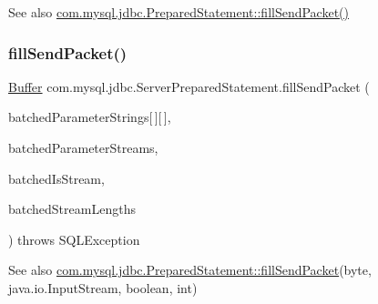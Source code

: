 \begin{DoxySeeAlso}{See also}
\mbox{\hyperlink{classcom_1_1mysql_1_1jdbc_1_1_prepared_statement_a0f1235a6e911d9370ef27e6ba5932d89}{com.\+mysql.\+jdbc.\+Prepared\+Statement\+::fill\+Send\+Packet()}} 
\end{DoxySeeAlso}
\mbox{\label{classcom_1_1mysql_1_1jdbc_1_1_server_prepared_statement_a923aa3af88e20d5927f9dbb827539724}} 
\subsubsection{\texorpdfstring{fill\+Send\+Packet()}{fillSendPacket()}\hspace{0.1cm}{\footnotesize\ttfamily [2/2]}}
{\footnotesize\ttfamily \mbox{\hyperlink{classcom_1_1mysql_1_1jdbc_1_1_buffer}{Buffer}} com.\+mysql.\+jdbc.\+Server\+Prepared\+Statement.\+fill\+Send\+Packet (\begin{DoxyParamCaption}\item[{byte}]{batched\+Parameter\+Strings\mbox{[}$\,$\mbox{]}\mbox{[}$\,$\mbox{]},  }\item[{Input\+Stream \mbox{[}$\,$\mbox{]}}]{batched\+Parameter\+Streams,  }\item[{boolean \mbox{[}$\,$\mbox{]}}]{batched\+Is\+Stream,  }\item[{int \mbox{[}$\,$\mbox{]}}]{batched\+Stream\+Lengths }\end{DoxyParamCaption}) throws S\+Q\+L\+Exception\hspace{0.3cm}{\ttfamily [protected]}}

\begin{DoxySeeAlso}{See also}
\mbox{\hyperlink{classcom_1_1mysql_1_1jdbc_1_1_prepared_statement_a0f1235a6e911d9370ef27e6ba5932d89}{com.\+mysql.\+jdbc.\+Prepared\+Statement\+::fill\+Send\+Packet}}(byte, java.\+io.\+Input\+Stream, boolean, int) 
\end{DoxySeeAlso}
\mbox{\label{classcom_1_1mysql_1_1jdbc_1_1_server_prepared_statement_abe61386d18ae6ff80a37435054d1ab98}} 
